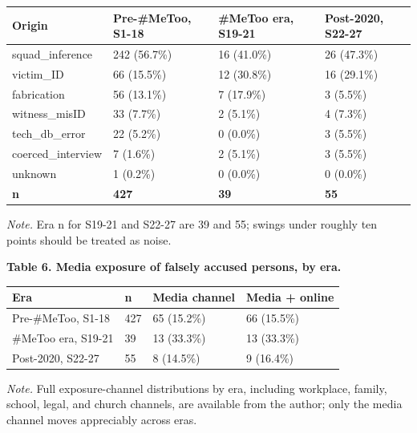 \documentclass[
]{article}
\newcounter{none} %
\begin{document}
{\def\LTcaptype{none} %
\begin{longtable}[]{@{}llll@{}}
\toprule\noalign{}
Origin & Pre-\#MeToo, S1-18 & \#MeToo era, S19-21 & Post-2020, S22-27 \\
\midrule\noalign{}
\endhead
\bottomrule\noalign{}
\endlastfoot
squad\_inference & 242 (56.7\%) & 16 (41.0\%) & 26 (47.3\%) \\
victim\_ID & 66 (15.5\%) & 12 (30.8\%) & 16 (29.1\%) \\
fabrication & 56 (13.1\%) & 7 (17.9\%) & 3 (5.5\%) \\
witness\_misID & 33 (7.7\%) & 2 (5.1\%) & 4 (7.3\%) \\
tech\_db\_error & 22 (5.2\%) & 0 (0.0\%) & 3 (5.5\%) \\
coerced\_interview & 7 (1.6\%) & 2 (5.1\%) & 3 (5.5\%) \\
unknown & 1 (0.2\%) & 0 (0.0\%) & 0 (0.0\%) \\
\textbf{n} & \textbf{427} & \textbf{39} & \textbf{55} \\
\end{longtable}
}

\emph{Note.} Era n for S19-21 and S22-27 are 39 and 55; swings under
roughly ten points should be treated as noise.

\textbf{Table 6. Media exposure of falsely accused persons, by era.}

{\def\LTcaptype{none} %
\begin{longtable}[]{@{}llll@{}}
\toprule\noalign{}
Era & n & Media channel & Media + online \\
\midrule\noalign{}
\endhead
\bottomrule\noalign{}
\endlastfoot
Pre-\#MeToo, S1-18 & 427 & 65 (15.2\%) & 66 (15.5\%) \\
\#MeToo era, S19-21 & 39 & 13 (33.3\%) & 13 (33.3\%) \\
Post-2020, S22-27 & 55 & 8 (14.5\%) & 9 (16.4\%) \\
\end{longtable}
}

\emph{Note.} Full exposure-channel distributions by era, including
workplace, family, school, legal, and church channels, are available
from the author; only the media channel moves appreciably across eras.
\end{document}
